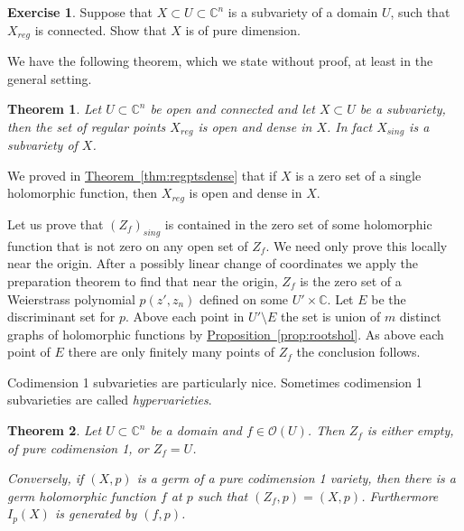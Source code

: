 \documentclass[12pt,openany]{book}
\newcommand{\C}{{\mathbb{C}}}
\newcommand{\sO}{{\mathscr{O}}}
\newcommand{\myindex}[1]{#1\index{#1}}
\theoremstyle{plain}
\newtheorem{thm}{Theorem}[section]
\theoremstyle{remark}
\theoremstyle{definition}
\newenvironment{exbox}{%
    \def\FrameCommand{\vrule width 1pt \relax\hspace {10pt}}%
    \MakeFramed {\advance \hsize -\width \FrameRestore }%
}{%
    \endMakeFramed
}
\theoremstyle{exercise}
\newtheorem{exercise}{Exercise}[section]
\theoremstyle{example}
\newcommand{\thmref}[1]{\hyperref[#1]{Theorem~\ref*{#1}}}
\newcommand{\propref}[1]{\hyperref[#1]{Proposition~\ref*{#1}}}
\begin{document}
\begin{exbox}
\begin{exercise}
Suppose that $X \subset U \subset \C^n$ is a subvariety
of a domain $U$, such that $X_{\mathit{reg}}$ is connected.  Show that $X$ is of
pure dimension.
\end{exercise}
\end{exbox}


We have the following theorem, which we
state without proof, at least in the general setting.

\begin{thm}
Let $U \subset \C^n$ be open and connected and let $X \subset U$
be a subvariety, then the set of regular points $X_{\mathit{reg}}$
is open and dense in $X$.
In fact $X_{\mathit{sing}}$ is a subvariety of $X$.
\end{thm}

We proved in \thmref{thm:regptsdense} that if $X$ is a zero set of a single
holomorphic function, then $X_{\mathit{reg}}$ is open and dense in $X$.

Let us prove that $(Z_f)_{\mathit{sing}}$ is contained in the zero set of some holomorphic
function that is not zero on any open set of $Z_f$.
We need only prove this locally near the origin.  After a possibly
linear change of coordinates we apply the preparation theorem to find
that near the origin, $Z_f$ is the zero set of a Weierstrass polynomial
$p(z',z_n)$ defined on some $U' \times \C$.
Let $E$ be the discriminant set for $p$.  Above each
point in $U' \setminus E$ the set is union of $m$ distinct graphs
of holomorphic functions by \propref{prop:rootshol}.  As above
each point of $E$ there are only finitely many points of $Z_f$ the conclusion
follows.

Codimension 1 subvarieties are particularly nice.  Sometimes codimension 1
subvarieties are called \emph{\myindex{hypervarieties}}.

\begin{thm} \label{thm:codim1var}
Let $U \subset \C^n$ be a domain and $f \in \sO(U)$.
Then $Z_f$ is either empty, of pure codimension 1, or $Z_f = U$.

Conversely, if $(X,p)$ is a germ of a pure codimension 1 variety, then
there is a germ holomorphic function $f$ at $p$
such that $(Z_f,p) = (X,p)$.  Furthermore $I_p(X)$ is generated by $(f,p)$.
\end{thm}
\end{document}
